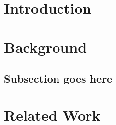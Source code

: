 \documentclass[journal]{IEEEtran}
\begin{document}







\maketitle

\begin{abstract}

\end{abstract}







%
\IEEEpeerreviewmaketitle


\section{Introduction}%

\section{Background}

\subsection{Subsection goes here}


\section{Related Work}
\end{document}
